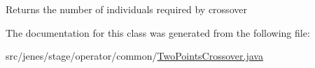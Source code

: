 \begin{DoxyReturn}{Returns}
the number of individuals required by crossover 
\end{DoxyReturn}


The documentation for this class was generated from the following file\-:\begin{DoxyCompactItemize}
\item 
src/jenes/stage/operator/common/\hyperlink{_two_points_crossover_8java}{Two\-Points\-Crossover.\-java}\end{DoxyCompactItemize}
